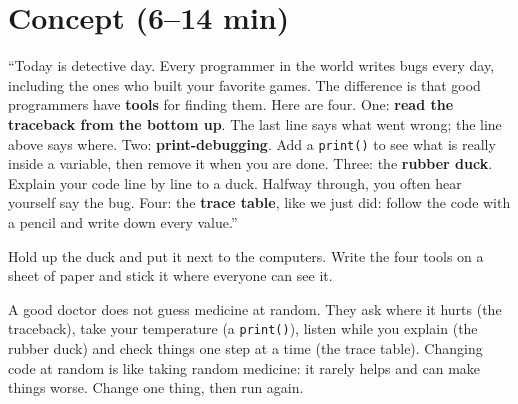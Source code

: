 \section{Concept (6--14 min)}
\begin{teacherscript}[Say]
\enquote{Today is detective day. Every programmer in the world writes bugs every day, including the ones who built your favorite games.
The difference is that good programmers have \textbf{tools} for finding them. Here are four.
One: \textbf{read the traceback from the bottom up}. The last line says what went wrong; the line above says where.
Two: \textbf{print-debugging}. Add a \texttt{print()} to see what is really inside a variable, then remove it when you are done.
Three: the \textbf{rubber duck}. Explain your code line by line to a duck. Halfway through, you often hear yourself say the bug.
Four: the \textbf{trace table}, like we just did: follow the code with a pencil and write down every value.}
\end{teacherscript}
Hold up the duck and put it next to the computers. Write the four tools on a sheet of paper and stick it where everyone can see it.

\begin{analogy}
A good doctor does not guess medicine at random. They ask where it hurts (the traceback), take your temperature (a \texttt{print()}),
listen while you explain (the rubber duck) and check things one step at a time (the trace table). Changing code at random
is like taking random medicine: it rarely helps and can make things worse. Change one thing, then run again.
\end{analogy}

